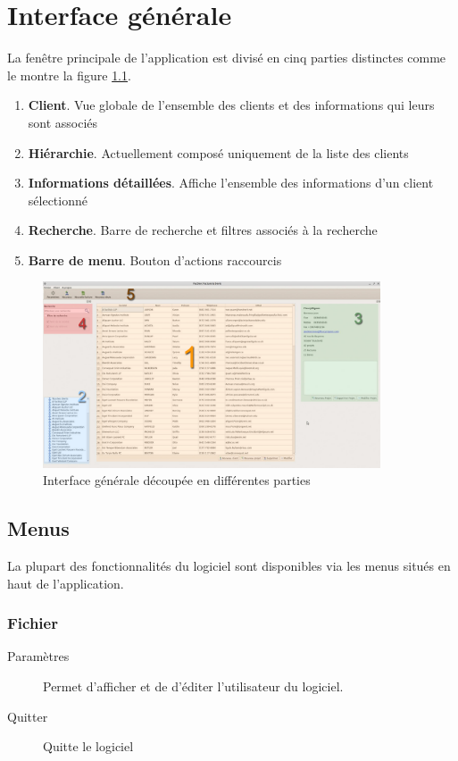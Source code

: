 \chapter{Interface générale}
La fenêtre principale de l'application est divisé en cinq parties distinctes comme le montre la figure \ref{fig:ihm}. 

\begin{enumerate}
	\item \textbf{Client}. Vue globale de l'ensemble des clients et des informations qui leurs sont associés
	\item \textbf{Hiérarchie}. Actuellement composé uniquement de la liste des clients
	\item \textbf{Informations détaillées}. Affiche l'ensemble des informations d’un client sélectionné
	\item \textbf{Recherche}. Barre de recherche et filtres associés à la recherche
	\item \textbf{Barre de menu}. Bouton d’actions raccourcis
\end{enumerate}

\begin{figure}[H]
	\centering
	\includegraphics[width=10cm]{screens/ihm.jpg}
	\caption{Interface générale découpée en différentes parties}
	\label{fig:ihm}
\end{figure}

\section{Menus}
La plupart des fonctionnalités du logiciel sont disponibles via les menus situés en haut de l’application. 

\subsection{Fichier}
	\begin{description}
		\item[Paramètres] Permet d'afficher et de d’éditer l’utilisateur du logiciel.
		\item[Quitter] Quitte le logiciel
	\end{description}
